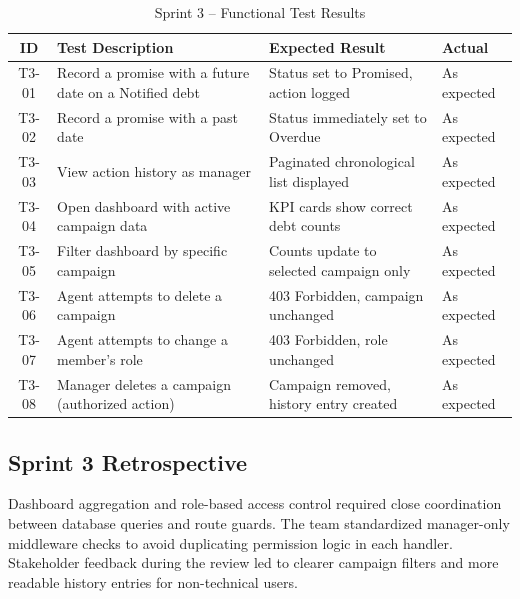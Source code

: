 \documentclass[12pt,a4paper]{report}
\newcommand{\reporttablesetup}{%
  \small%
  \setlength{\tabcolsep}{5pt}%
  \renewcommand{\arraystretch}{1.38}%
  \arrayrulecolor{framegray}%
}
\begin{document}
\begin{table}[H]
  \centering
  \renewcommand{\arraystretch}{1.3}
  \footnotesize\reporttablesetup
  \begin{tabularx}{\textwidth}{|c|Y|p{3.85cm}|p{1.8cm}|}
    \hline
    \textbf{ID} & \textbf{Test Description} & \textbf{Expected Result} & \textbf{Actual} \\
    \hline
    T3-01 & Record a promise with a future date on a Notified debt  & Status set to Promised, action logged       & As expected \\
    \hline
    T3-02 & Record a promise with a past date                       & Status immediately set to Overdue           & As expected \\
    \hline
    T3-03 & View action history as manager                          & Paginated chronological list displayed      & As expected \\
    \hline
    T3-04 & Open dashboard with active campaign data                & KPI cards show correct debt counts          & As expected \\
    \hline
    T3-05 & Filter dashboard by specific campaign                   & Counts update to selected campaign only     & As expected \\
    \hline
    T3-06 & Agent attempts to delete a campaign                     & 403 Forbidden, campaign unchanged           & As expected \\
    \hline
    T3-07 & Agent attempts to change a member's role               & 403 Forbidden, role unchanged               & As expected \\
    \hline
    T3-08 & Manager deletes a campaign (authorized action)          & Campaign removed, history entry created     & As expected \\
    \hline
  \end{tabularx}
  \caption{Sprint 3 -- Functional Test Results}
  \label{tab:test-s3}
\end{table}

\subsection{Sprint 3 Retrospective}

Dashboard aggregation and role-based access control required close coordination between
database queries and route guards.
The team standardized manager-only middleware checks to avoid duplicating permission logic in
each handler.
Stakeholder feedback during the review led to clearer campaign filters and more readable
history entries for non-technical users.
\end{document}
